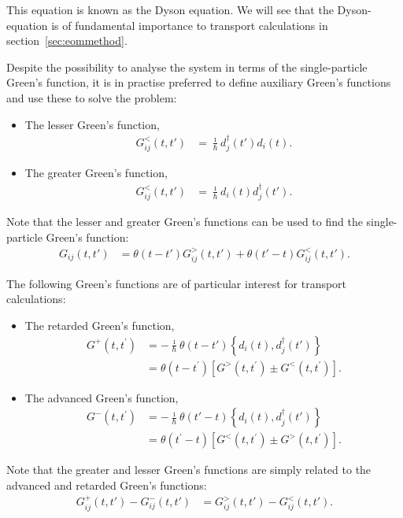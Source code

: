 This equation is known as the Dyson equation. We will see that the Dyson-equation is of fundamental importance to transport calculations in section~\ref{sec:eommethod}.

Despite the possibility to analyse the system in terms of the single-particle Green's function, it is in practise preferred to define auxiliary Green's functions and use these to solve the problem:
\begin{itemize}
\item The lesser Green's function, 
\begin{align*}
G^<_{ij}(t,t') &= \frac{\imath}{\hbar}d^\dagger_j(t')d_i(t).
\end{align*}
\item The greater Green's function, 
\begin{align*}
G^<_{ij}(t,t') &= \frac{\imath}{\hbar}d_i(t)d^\dagger_j(t').
\end{align*}
\end{itemize}
Note that the lesser and greater Green's functions can be used to find the single-particle Green's function:
\begin{align*}
G_{ij}(t,t') &= \theta(t-t')G^>_{ij} (t,t') + \theta(t'-t) G_{ij}^<(t,t').
\end{align*}

The following Green's functions are of particular interest for transport calculations: 
\begin{itemize}
\item The retarded Green's function, \begin{align*}
G^+(t,t^\prime) &=
-\frac{\imath}{\hbar} \theta(t-t') \left\{ d_i(t), d^\dagger_j(t')\right\}
\\ &=\theta(t-t^\prime) \left[ G^>(t,t^\prime) \pm G^<(t,t^\prime)\right].
\end{align*}
\item The advanced Green's function, \begin{align*}
G^-(t,t^\prime) &=
-\frac{\imath}{\hbar} \theta(t'-t) \left\{ d_i(t), d^\dagger_j(t')\right\}
\\ &= \theta(t^\prime-t) \left[ G^<(t,t^\prime) \pm G^>(t,t^\prime)\right].
\end{align*}
\end{itemize}
Note that the greater and lesser Green's functions are simply related to the advanced and retarded Green's functions:
\begin{align*}
G^+_{ij}(t,t') - G^-_{ij}(t,t') &= G^>_{ij}(t,t') - G^<_{ij}(t,t').
\end{align*}

